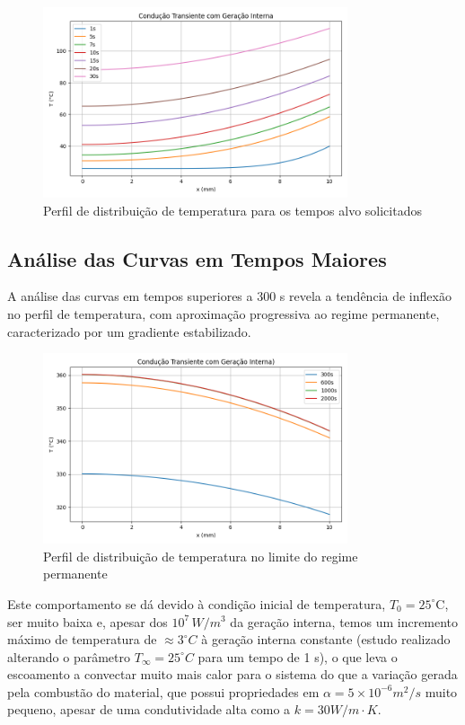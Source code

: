 \documentclass[12pt]{article}
\begin{document}
\begin{figure}[H]
    \centering
    \includegraphics[width=0.8\textwidth]{img/Figure_4.png}
    \caption{Perfil de distribuição de temperatura para os tempos alvo solicitados}
\end{figure}

\subsection{Análise das Curvas em Tempos Maiores}

A análise das curvas em tempos superiores a 300 s revela a tendência de inflexão no perfil de temperatura, com aproximação progressiva ao regime permanente, caracterizado por um gradiente estabilizado.

\begin{figure}[H]
    \centering
    \includegraphics[width=0.8\textwidth]{img/Figure_6.png}
    \caption{Perfil de distribuição de temperatura no limite do regime permanente}
\end{figure}

Este comportamento se dá devido à condição inicial de temperatura, $T_0 = 25^\circ\mathrm{C}$, ser muito baixa e, apesar dos $10^7\,W/m^3$ da geração interna, temos um incremento máximo de temperatura de $\approx 3^\circ C$ à geração interna constante (estudo realizado alterando o parâmetro $T_\infty=25^\circ C$ para um tempo de 1 s), o que leva o escoamento a convectar muito mais calor para o sistema do que a variação gerada pela combustão do material, que possui propriedades em $\alpha = 5 \times 10^{-6} m^2/s$ muito pequeno, apesar de uma condutividade alta como a $k=30 W/m \cdot K$.
\end{document}
